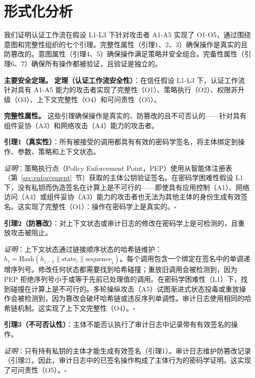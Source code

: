 \section{形式化分析}
\label{sec:formal-analysis}

我们证明认证工作流在假设 L1-L3 下针对攻击者 A1-A5 实现了 O1-O5，通过围绕意图和完整性组织的七个引理。完整性属性（引理1、2、3）确保操作是真实的且防篡改的。意图属性（引理4、5）确保操作满足策略并安全组合。完备性属性（引理6、7）确保所有操作都被验证，且验证是独立的。

\noindent\textbf{主要安全定理。} \textbf{定理（认证工作流安全性）}：在信任假设 L1-L3 下，认证工作流针对具有 A1-A5 能力的攻击者实现了完整性（O1）、策略执行（O2）、权限非升级（O3）、上下文完整性（O4）和可问责性（O5）。

\noindent\textbf{完整性属性。} 这些引理确保操作是真实的、防篡改的且不可否认的——针对具有组件妥协（A3）和网络攻击（A4）能力的攻击者。

\textbf{引理1（真实性）}：所有被接受的调用都具有有效的密码学签名，将主体绑定到操作、参数、策略和上下文状态。

\textit{证明}：策略执行点（Policy Enforcement Point，PEP）使用从智能体注册表（第~\ref{sec:enforcement}~节）获取的主体公钥验证签名。在密码学困难性假设 L1 下，没有私钥而伪造签名在计算上是不可行的——即使具有应用控制（A1）、网络访问（A4）或组件妥协（A3）能力的攻击者也无法为其他主体的身份生成有效签名。这实现了完整性（O1）：操作在密码学上是真实的。$\square$

\textbf{引理2（防篡改）}：对上下文状态或审计日志的修改在密码学上是可检测的，且重放攻击被阻止。

\textit{证明}：上下文状态通过链接顺序状态的哈希链维护：$h_i = \text{Hash}(h_{i-1} \parallel \text{state}_i \parallel \text{sequence}_i)$。每个调用包含一个绑定在签名中的单调递增序列号。修改任何状态都需要找到哈希碰撞；重放旧调用会被检测到，因为 PEP 拒绝序列号小于或等于先前已处理值的调用。在密码学困难性（L1）下，找到碰撞在计算上是不可行的。多轮操纵攻击（A5）试图渐进式状态投毒或重放操作会被检测到，因为篡改会破坏哈希链或违反序列单调性。审计日志使用相同的哈希链机制。这实现了上下文完整性（O4）。$\square$

\textbf{引理3（不可否认性）}：主体不能否认执行了审计日志中记录带有有效签名的操作。

\textit{证明}：只有持有私钥的主体才能生成有效签名（引理1）。审计日志维护防篡改记录（引理2）。因此，审计日志中的已签名操作构成了主体行为的密码学证明。这实现了可问责性（O5）。$\square$

